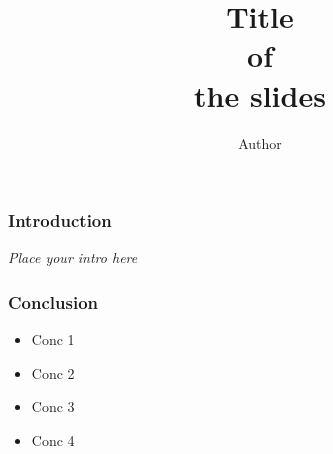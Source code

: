 \documentclass[11pt,mathserif]{beamer}
\author[Author]{Author}
\institute[SSU]{
	Saratov State University, 
	\\Saratov, Russia

}
\title[]{Title
	\\of 
	\\the slides}
\date[short event name]{}
\begin{document}
\maketitle

\begin{frame}
	\frametitle{Introduction}
	\textit{Place your intro here}
\end{frame}






\begin{frame}
	\frametitle{Conclusion}
	\begin{itemize}
		\item
		      Conc 1
		\item
		      Conc 2
		\item
		      Conc 3
		\item
		      Conc 4
	\end{itemize}
\end{frame}
\end{document}
